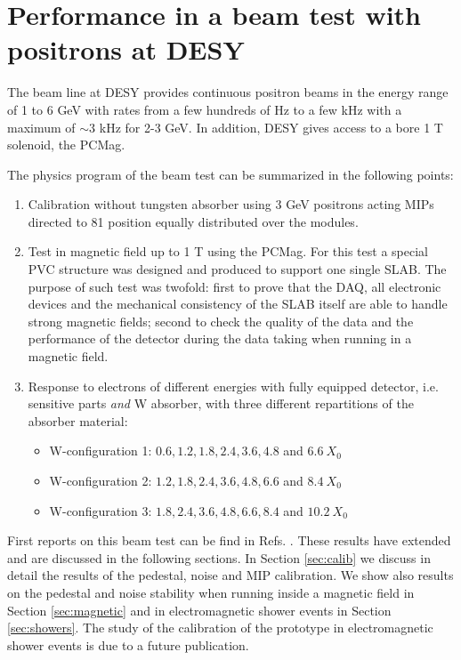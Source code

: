 \documentclass[a4paper,11pt]{article}
\begin{document}
\section{Performance in a beam test with positrons at DESY}
\label{sec:beamtest}


The beam line at DESY provides continuous positron beams in the energy range of 1 to 6 GeV with
rates from a few hundreds of Hz to a few kHz with a maximum of $\sim 3$ kHz for 2-3 GeV. 
In addition, DESY gives access to a bore 1 T solenoid, the PCMag.

The physics program of the beam test can be summarized in the following points:

\begin{enumerate}
\item Calibration without tungsten absorber using 3 GeV positrons acting MIPs directed to 81 position equally distributed over the modules.
\item Test in magnetic field up to 1 T using the PCMag. For this test a special PVC structure was
  designed and produced to support one single SLAB.	
  The purpose of such test was twofold: first to prove that the DAQ, all electronic devices and the 
  mechanical consistency of the SLAB itself are able
  to handle strong magnetic fields; 
  second to check the quality of the data and the performance of the detector during the data taking when running
  in a magnetic field. 
  \item Response to electrons of different energies with fully equipped detector, i.e. sensitive parts {\it and} W absorber, with three different repartitions of the absorber material:
  \begin{itemize}
  \item W-configuration 1: $0.6,1.2,1.8,2.4,3.6,4.8$ and $6.6~X_{0}$
  \item W-configuration 2: $1.2,1.8,2.4,3.6,4.8,6.6$ and $8.4~X_{0}$
  \item W-configuration 3: $1.8,2.4,3.6,4.8,6.6,8.4$ and $10.2~X_{0}$
  \end{itemize}
\end{enumerate}

First reports on this beam test can be find in
Refs. \cite{Irles:2018uum,Irles:2018hcd}. These results have extended and
are discussed in the following sections. In Section \ref{sec:calib} we discuss in detail
the results of the pedestal, noise and MIP calibration.
We show also results on the pedestal and noise stability when running inside
a magnetic field in Section \ref{sec:magnetic} and in electromagnetic shower
events in Section \ref{sec:showers}. The study of the calibration of the prototype
in electromagnetic shower events is due to a future publication.
\end{document}
